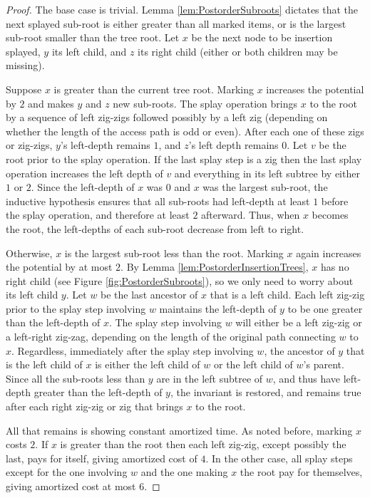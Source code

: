 \documentclass{article}
\theoremstyle{plain}
\theoremstyle{definition}
\begin{document}
\begin{proof}
%
The base case is trivial. Lemma \ref{lem:PostorderSubroots} dictates that the
next splayed sub-root is either greater than all marked items, or is the
largest sub-root smaller than the tree root. Let $x$ be the next node to be
insertion splayed, $y$ its left child, and $z$ its right child (either or both
children may be missing).

%
Suppose $x$ is greater than the current tree root. Marking $x$ increases the
potential by $2$ and makes $y$ and $z$ new sub-roots. The splay operation
brings $x$ to the root by a sequence of left zig-zigs followed possibly by a
left zig (depending on whether the length of the access path is odd or even).
After each one of these zigs or zig-zigs, $y$'s left-depth remains $1$, and
$z$'s left depth remains $0$. Let $v$ be the root prior to the splay operation.
If the last splay step is a zig then the last splay operation increases the
left depth of $v$ and everything in its left subtree by either $1$ or $2$.
Since the left-depth of $x$ was $0$ and $x$ was the largest sub-root, the
inductive hypothesis ensures that all sub-roots had left-depth at least $1$
before the splay operation, and therefore at least $2$ afterward. Thus, when
$x$ becomes the root, the left-depths of each sub-root decrease from left to
right.

%
Otherwise, $x$ is the largest sub-root less than the root. Marking $x$ again
increases the potential by at most $2$. By Lemma
\ref{lem:PostorderInsertionTrees}, $x$ has no right child (see Figure
\ref{fig:PostorderSubroots}), so we only need to worry about its left child
$y$. Let $w$ be the last ancestor of $x$ that is a left child. Each left
zig-zig prior to the splay step involving $w$ maintains the left-depth of $y$
to be one greater than the left-depth of $x$. The splay step involving $w$ will
either be a left zig-zig or a left-right zig-zag, depending on the length of
the original path connecting $w$ to $x$. Regardless, immediately after the
splay step involving $w$, the ancestor of $y$ that is the left child of $x$ is
either the left child of $w$ or the left child of $w$'s parent. Since all the
sub-roots less than $y$ are in the left subtree of $w$, and thus have
left-depth greater than the left-depth of $y$, the invariant is restored, and
remains true after each right zig-zig or zig that brings $x$ to the root.

%
All that remains is showing constant amortized time. As noted before, marking
$x$ costs $2$. If $x$ is greater than the root then each left zig-zig, except
possibly the last, pays for itself, giving amortized cost of $4$. In the other
case, all splay steps except for the one involving $w$ and the one making $x$
the root pay for themselves, giving amortized cost at most $6$.
\end{proof}
\end{document}

